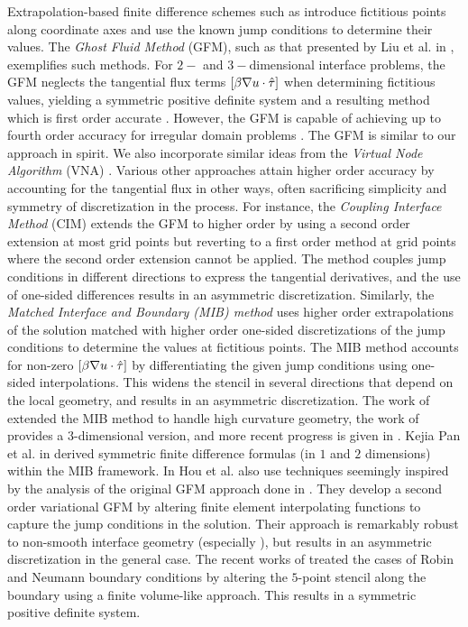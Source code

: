 Extrapolation-based finite difference schemes such as \cite{Liu.Xu-Dong00, Gibou02, Gibou05, Jomaa05, Zhou.Y.C.06.03, Chern07} introduce fictitious points along coordinate axes and use the known jump conditions to determine their values. The \emph{Ghost Fluid Method} (GFM), such as that presented by Liu et al. in \cite{Liu.Xu-Dong00}, exemplifies such methods. For $2-$ and $3-$dimensional interface problems, the GFM neglects the tangential flux terms $\left[ \beta \nabla u \cdot \hat{\mathbf{\tau}} \right]$ when determining fictitious values, yielding a symmetric positive definite system and a resulting method which is first order accurate \cite{Liu.Xu-Dong00, Liu.Xu-Dong03}. However, the GFM is capable of achieving up to fourth order accuracy for irregular domain problems \cite{Gibou02, Gibou05}. The GFM is similar to our approach in spirit. We also incorporate similar ideas from the \emph{Virtual Node Algorithm} (VNA) \cite{Molino05, Bao.Zhaosheng07, Sifakis07}. Various other approaches attain higher order accuracy by accounting for the tangential flux in other ways, often sacrificing simplicity and symmetry of discretization in the process. For instance, the \emph{Coupling Interface Method} (CIM) \cite{Chern07} extends the GFM to higher order by using a second order extension at most grid points but reverting to a first order method at grid points where the second order extension cannot be applied. The method couples jump conditions in different directions to express the tangential derivatives, and the use of one-sided differences results in an asymmetric discretization. Similarly, the \emph{Matched Interface and Boundary \textnormal{(MIB)} method} \cite{Zhou.Y.C.06.03} uses higher order extrapolations of the solution matched with higher order one-sided discretizations of the jump conditions to determine the values at fictitious points. The MIB method accounts for non-zero $\left[ \beta \nabla u \cdot \hat{\mathbf{\tau}} \right]$ by differentiating the given jump conditions using one-sided interpolations. This widens the stencil in several directions that depend on the local geometry, and results in an asymmetric discretization. The work of \cite{Zhou.Y.C.06.11} extended the MIB method to handle high curvature geometry, the work of \cite{Yu.Sining07} provides a $3$-dimensional version, and more recent progress is given in \cite{Zhao.Shan09}. Kejia Pan et al. in \cite{Pan.Kejia10} derived symmetric finite difference formulas (in $1$ and $2$ dimensions) within the MIB framework. In \cite{Hou.Songming05,Hou.Songming10} Hou et al. also use techniques seemingly inspired by the analysis of the original GFM approach done in \cite{Liu.Xu-Dong00,Liu.Xu-Dong03}. They develop a second order variational GFM by altering finite element interpolating functions to capture the jump conditions in the solution. Their approach is remarkably robust to non-smooth interface geometry (especially \cite{Hou.Songming10}), but results in an asymmetric discretization in the general case. The recent works of \cite{Ng.YenTing09, Papac10} treated the cases of Robin and Neumann boundary conditions by altering the $5$-point stencil along the boundary using a finite volume-like approach. This results in a symmetric positive definite system.

